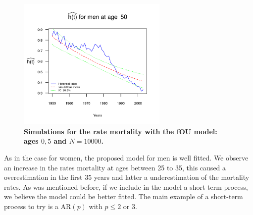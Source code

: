\documentclass[smallextended]{svjour3}
\begin{document}
\begin{figure}[H]
    \includegraphics[width = 2.85in]{PlotMen50.png}
    \caption{\bf Simulations for the rate mortality with the fOU model: ages 
    $0,5$ and $N=10000$.}
    \label{graph-simu_FOU3}
\end{figure}\vspace*{0.1cm}

As in the case for women, the proposed model for men is well fitted. 
We observe an increase in the rates mortality at ages between 25 to 35, this 
caused a overestimation in the first 35 years and latter a underestimation
of the mortality rates. As was mentioned before, if we include in the model a 
short-term process,  we believe the model could be better fitted. The main 
example  of a short-term process to try is a AR$(p)$ with $p\le 2$ or $3$.
\end{document}

